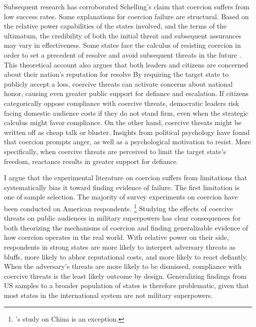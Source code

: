 Subsequent research has corroborated Schelling's claim that coercion suffers from low success rates. Some explanations for coercion failure are structural. Based on the relative power capabilities of the states involved, and the terms of the ultimatum, the credibility of both the initial threat and subsequent assurances may vary in effectiveness. \autocite{fearon_domestic_1994, schelling_arms_1966} Some states face the calculus of resisting coercion in order to set a precedent of resolve and avoid subsequent threats in the future \autocite{sechser_goliaths_2010, sechser_reputations_2018}. This theoretical account also argues that both leaders and citizens are concerned about their nation's reputation for resolve \autocite{yarhi-milo_tying_2018, lupton_reputation_2020, dafoe_reputations_2021} By requiring the target state to publicly accept a loss, coercive threats can activate concerns about national honor, causing even greater public support for defiance and escalation.\autocite{dafoe_coercion_2021, dafoe_provocation_2022} If citizens categorically oppose compliance with coercive threats, democratic leaders risk facing domestic audience costs if they do not stand firm, even when the strategic calculus might favor compliance.\autocite{fearon_domestic_1994, tomz_domestic_2007, davies_audience_2013, levy_backing_2015, yarhi-milo_tying_2018} On the other hand, coercive threats might be written off as cheap talk or bluster.\autocite{fearon_domestic_1994, snyder_cost_2011, yarhi-milo_tying_2018} Insights from political psychology have found that coercion prompts anger, as well as a psychological motivation to resist. More specifically, when coercive threats are perceived to limit the target state's freedom, reactance results in greater support for defiance.\autocite{schaub_deterrence_2004, powers_psychology_2023}  

I argue that the experimental literature on coercion suffers from limitations that systematically bias it toward finding evidence of failure. The first limitation is one of sample selection. The majority of survey experiments on coercion have been conducted on American respondents. \footnote{\citeauthor{dafoe_provocation_2022}'s study on China is an exception.} Studying the effects of coercive threats on public audiences in military superpowers has clear consequences for both theorizing the mechanisms of coercion and finding generalizable evidence of how coercion operates in the real world. With relative power on their side, respondents in strong states are more likely to interpret adversary threats as bluffs, more likely to abhor reputational costs, and more likely to react defiantly. When the adversary's threats are more likely to be dismissed, compliance with coercive threats is the least likely outcome by design. Generalizing findings from US samples to a broader population of states is therefore problematic, given that most states in the international system are not military superpowers. 

